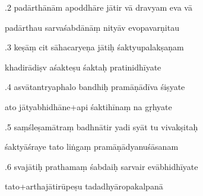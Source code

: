 \documentclass[article,12pt,a4paper]{memoir}%
\newcounter{parCount}
\begin{document}
	  
	  \pstart {}.2 padārthānām apoddhāre jātir vā dravyam eva vā 
	{}
	\pend%
      

	  
	  \pstart \leavevmode%
	padārthau sarvaśabdānāṃ nityāv evopavarṇitau 
	{}
	\pend%
      

	  
	  \pstart {}.3 keṣāṃ cit sāhacaryeṇa jātiḥ śaktyupalakṣaṇam 
	{}
	\pend%
      

	  
	  \pstart \leavevmode%
	khadirādiṣv aśakteṣu śaktaḥ pratinidhīyate 
	{}
	\pend%
      

	  
	  \pstart {}.4 asvātantryaphalo bandhiḥ pramāṇādīva śiṣyate 
	{}
	\pend%
      

	  
	  \pstart \leavevmode%
	ato jātyabhidhāne+api śaktihīnaṃ na gṛhyate 
	{}
	\pend%
      

	  
	  \pstart {}.5 saṃśleṣamātraṃ badhnātir yadi syāt tu vivakṣitaḥ 
	{}
	\pend%
      

	  
	  \pstart \leavevmode%
	śaktyāśraye tato liṅgaṃ pramāṇādyanuśāsanam 
	{}
	\pend%
      

	  
	  \pstart {}.6 svajātiḥ prathamaṃ śabdaiḥ sarvair evābhidhīyate 
	{}
	\pend%
      

	  
	  \pstart \leavevmode%
	tato+arthajātirūpeṣu tadadhyāropakalpanā 
	{}
	\pend%
      
\end{document}
